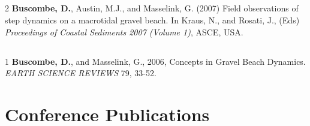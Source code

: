 \documentclass[margin,line]{resume}
\begin{document}
\begin{resume}
\begin{footnotesize}
\begin{list1}
	\end{list1}

	\subsection{}
	\begin{list1}
	\item[2] {\bf Buscombe, D.}, Austin, M.J., and Masselink, G. (2007) Field observations of step dynamics on a macrotidal gravel beach. In Kraus, N., and Rosati, J., (Eds) {\sl Proceedings of Coastal Sediments 2007 (Volume 1)}, ASCE, USA.
	\end{list1}

	\subsection{}
	\begin{list1}
	\item[1] {\bf Buscombe, D.}, and Masselink, G., 2006, Concepts in Gravel Beach Dynamics. {\sl EARTH SCIENCE REVIEWS} 79, 33-52.
	\end{list1}

        \end{footnotesize}

    \section{\mysidestyle Conference Publications}

        \begin{footnotesize}


%        

        
	\subsection{}
	\begin{list1}	


\end{list1}
\end{footnotesize}
\end{resume}
\end{document}
